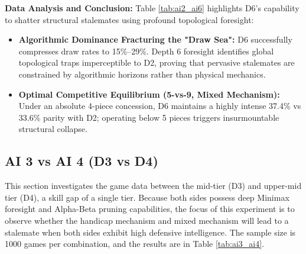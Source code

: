 \textbf{Data Analysis and Conclusion:} 
Table \ref{tab:ai2_ai6} highlights D6's capability to shatter structural stalemates using profound topological foresight:
\begin{itemize}
    \item \textbf{Algorithmic Dominance Fracturing the "Draw Sea":} D6 successfully compresses draw rates to 15\%--29\%. Depth 6 foresight identifies global topological traps imperceptible to D2, proving that pervasive stalemates are constrained by algorithmic horizons rather than physical mechanics.
    \item \textbf{Optimal Competitive Equilibrium (5-vs-9, Mixed Mechanism):} Under an absolute 4-piece concession, D6 maintains a highly intense 37.4\% vs 33.6\% parity with D2; operating below 5 pieces triggers insurmountable structural collapse.
\end{itemize}

\subsection{AI 3 vs AI 4 (D3 vs D4)}
\label{subsec:ai3_ai4}

This section investigates the game data between the mid-tier (D3) and upper-mid tier (D4), a skill gap of a single tier. Because both sides possess deep Minimax foresight and Alpha-Beta pruning capabilities, the focus of this experiment is to observe whether the handicap mechanism and mixed mechanism will lead to a stalemate when both sides exhibit high defensive intelligence. The sample size is 1000 games per combination, and the results are in Table \ref{tab:ai3_ai4}.

\begin{table}[htbp]
    \centering
    \caption{AI 3 vs AI 4 Simulation Data Distribution (Sample Size=1000)}
    \label{tab:ai3_ai4}
\end{table}

